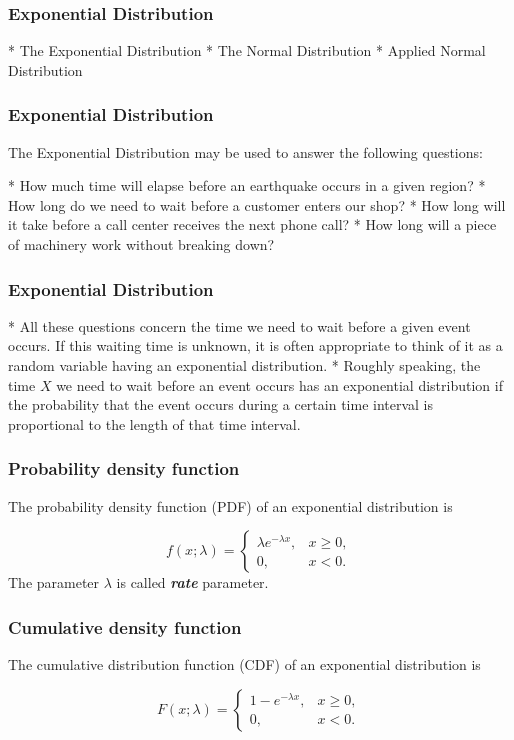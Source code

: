 
\begin{frame}[fragile]
\frametitle{Exponential Distribution}
\begin{itemize}
*  The Exponential Distribution
*  The Normal Distribution
*  Applied Normal Distribution
\end{itemize}
\end{frame}

\begin{frame}[fragile]
\frametitle{Exponential Distribution}
The Exponential Distribution may be used to answer the following questions:
\begin{itemize}
*  How much time will elapse before an earthquake occurs in a given region?
*  How long do we need to wait before a customer enters our shop?
*  How long will it take before a call center receives the next phone call?
*  How long will a piece of machinery work without breaking down?
\end{itemize}
\end{frame}  

\begin{frame}[fragile]
\frametitle{Exponential Distribution}

\begin{itemize}
*  All these questions concern the time we need to wait before a given event occurs. If this waiting time is unknown, it is often appropriate to think of it as a random variable having an exponential distribution.
*  Roughly speaking, the time $X$ we need to wait before an event occurs has an exponential distribution if the probability that the event occurs during a certain time interval is proportional to the length of that time interval.

\end{itemize}
\end{frame}

\begin{frame}[fragile]
\frametitle{Probability density function}
The probability density function (PDF) of an exponential distribution is

\[
f(x;\lambda) = \begin{cases}
\lambda e^{-\lambda x}, & x \ge 0, \\
0, & x < 0.
\end{cases}\]
The parameter $\lambda$  is called \textbf{\emph{rate}} parameter.
\end{frame}

\begin{frame}[fragile]
\frametitle{Cumulative density function}
The cumulative distribution function (CDF) of an exponential distribution is

\[
F(x;\lambda) = \begin{cases}
1-e^{-\lambda x}, & x \ge 0, \\
0, & x < 0.
\end{cases}\]

\end{frame}

